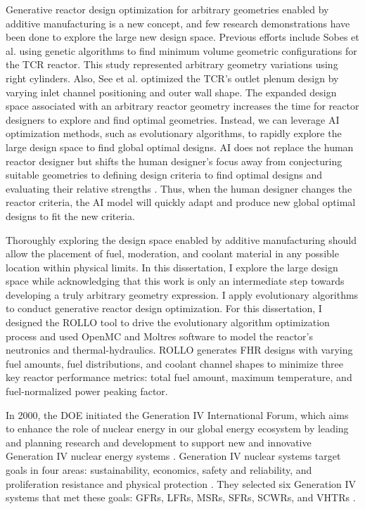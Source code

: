 Generative reactor design optimization for arbitrary geometries enabled by additive 
manufacturing is a new concept, and few research demonstrations have been done to 
explore the large new design space. 
Previous efforts include Sobes et al. \cite{sobes_artificial_2020} using genetic 
algorithms to find minimum volume geometric configurations for the TCR reactor. 
This study represented arbitrary geometry variations using right cylinders. 
Also, See et al. \cite{see_design_2022} optimized the TCR's outlet plenum design 
by varying inlet channel positioning and outer wall shape.  
The expanded design space associated with an arbitrary reactor geometry increases 
the time for reactor designers to explore and find optimal geometries. 
Instead, we can leverage \gls{AI} optimization methods, such as evolutionary algorithms, 
to rapidly explore the large design space to find global optimal designs. 
\gls{AI} does not replace the human reactor designer but shifts the human designer's 
focus away from conjecturing suitable geometries to defining design criteria to 
find optimal designs and evaluating their relative strengths \cite{sobes_artificial_2020}. 
Thus, when the human designer changes the reactor criteria, the AI model will quickly 
adapt and produce new global optimal designs to fit the new criteria.

Thoroughly exploring the design space enabled by additive manufacturing should allow 
the placement of fuel, moderation, and coolant material in any possible location 
within physical limits. 
In this dissertation, I explore the large design space while acknowledging that 
this work is only an intermediate step towards developing a truly arbitrary 
geometry expression. 
I apply evolutionary algorithms to conduct generative reactor design optimization. 
For this dissertation, I designed the \gls{ROLLO} tool \cite{chee_rollo_2021} to 
drive the evolutionary algorithm optimization process and used OpenMC 
\cite{romano_openmc:_2015} and Moltres \cite{lindsay_introduction_2018} software to 
model the reactor's neutronics and thermal-hydraulics. 
\gls{ROLLO} generates \gls{FHR} designs with varying fuel amounts, fuel 
distributions, and coolant channel shapes to minimize three key reactor performance 
metrics: total fuel amount, maximum temperature, and fuel-normalized power peaking 
factor. 

In 2000, the \gls{DOE} initiated the Generation IV International Forum, which aims 
to enhance the role of nuclear energy in our global energy ecosystem by 
leading and planning research and development to support new and innovative 
Generation IV nuclear energy systems \cite{gif_technology_2002}.
Generation IV nuclear systems target goals in four areas: sustainability, 
economics, safety and reliability, and proliferation resistance and physical 
protection \cite{gif_technology_2002}. 
They selected six Generation IV systems that met these goals: \glspl{GFR}, 
\glspl{LFR}, \glspl{MSR}, \glspl{SFR}, \glspl{SCWR}, and \glspl{VHTR} 
\cite{gif_technology_2002}. 

